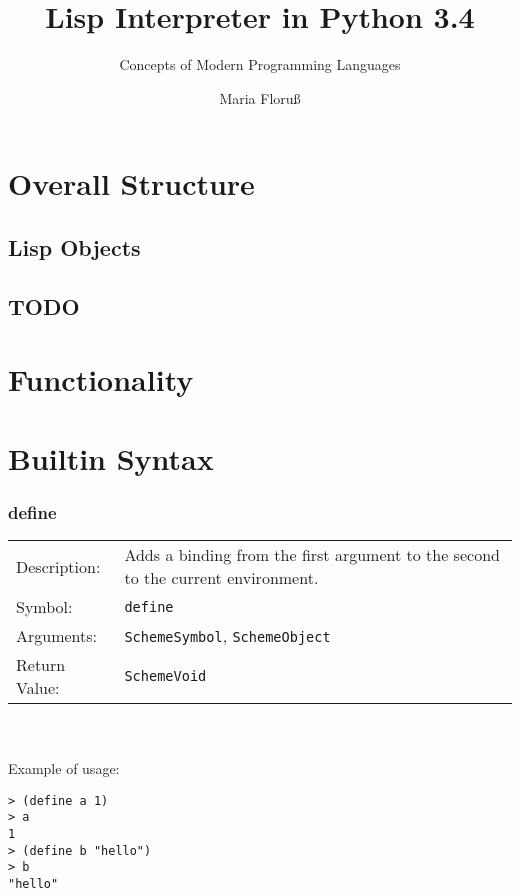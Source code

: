 \documentclass[12pt,a4paper]{scrartcl}
\begin{document}
\title{Lisp Interpreter in Python 3.4}
\subtitle{Concepts of Modern Programming Languages}
\author{Maria Floru\ss}
\maketitle
\newpage

\section*{Overall Structure}

\subsection*{Lisp Objects}
\subsection*{TODO}

\section*{Functionality}

\section*{Builtin Syntax}

\subsubsection*{define}
\begin{tabular}{l  p{13cm}}
Description: & Adds a binding from the first argument to the second to the current environment.\\
Symbol: & \lstinline{define}\\
Arguments: & \lstinline{SchemeSymbol}, \lstinline{SchemeObject}\\
Return Value: & \lstinline{SchemeVoid}\\
\end{tabular}
\\
\\
Example of usage:
\begin{lstlisting}
> (define a 1)
> a
1
> (define b "hello")
> b
"hello"
\end{lstlisting}
\end{document}
